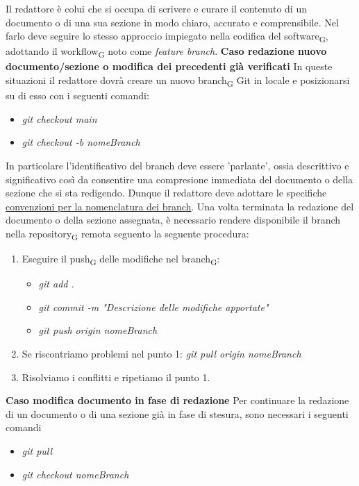 Il redattore è colui che si occupa di scrivere e curare il contenuto di un documento o di una sua sezione in modo chiaro, accurato e comprensibile.
Nel farlo deve seguire lo stesso approccio impiegato nella codifica del {software\textsubscript{G}}, adottando il
{workflow\textsubscript{G}} noto come \textit{feature branch}.
\textbf{Caso redazione nuovo documento/sezione o modifica dei precedenti già verificati}
In queste situazioni il redattore dovrà creare un nuovo {branch\textsubscript{G}} Git in locale e posizionarsi su di esso con i seguenti comandi:
\begin{itemize}
    \item \textit{git checkout main}
    \item \textit{git checkout -b nomeBranch}
\end{itemize}
In particolare l'identificativo del branch deve essere 'parlante', ossia descrittivo e significativo così da consentire una compresione immediata
del documento o della sezione che si sta redigendo. Dunque il redattore deve adottare le specifiche 
\href{#convenzioni_nomenclatura}{\underline{convenzioni per la nomenclatura dei branch}}.
Una volta terminata la redazione del documento o della sezione assegnata, è necessario rendere disponibile il branch
nella {repository\textsubscript{G}} remota seguento la seguente procedura:
\begin{enumerate}
    \item Eseguire il {push\textsubscript{G}} delle modifiche nel {branch\textsubscript{G}}:
    \begin{itemize}
        \item \textit{git add .}
        \item \textit{git commit -m "Descrizione delle modifiche apportate"}
        \item \textit{git push origin nomeBranch}
    \end{itemize}
    \item Se riscontriamo problemi nel punto 1:
    \textit{git pull origin nomeBranch}
    \item Risolviamo i conflitti e ripetiamo il punto 1.
\end{enumerate}
\textbf{Caso modifica documento in fase di redazione}
Per continuare la redazione di un documento o di una sezione già in fase di stesura, sono necessari i seguenti comandi
\begin{itemize}
    \item \textit{git pull}
    \item \textit{git checkout nomeBranch}
\end{itemize}
